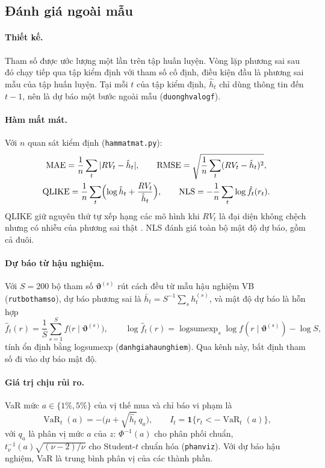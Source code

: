 \documentclass[11pt,a4paper]{article}
\renewcommand{\_}{\gachduoi\allowbreak}
\newcommand{\tep}[1]{\texttt{#1}}
\newcommand{\ham}[1]{\texttt{#1}}
\DeclareMathOperator{\VaR}{VaR}
\newcommand{\btheta}{\boldsymbol\vartheta}
\begin{document}
\subsection{Đánh giá ngoài mẫu}\label{sec:ngoai-mau}
\paragraph{Thiết kế.} Tham số được ước lượng một lần trên tập huấn luyện. Vòng lặp phương sai sau đó chạy tiếp qua tập kiểm định với tham số cố định, điều kiện đầu là phương sai mẫu của tập huấn luyện. Tại mỗi $t$ của tập kiểm định, $\hat h_t$ chỉ dùng thông tin đến $t-1$, nên là dự báo một bước ngoài mẫu (\ham{duong\_h\_va\_logf}).

\paragraph{Hàm mất mát.} Với $n$ quan sát kiểm định (\tep{ham\_mat\_mat.py}):
\begin{gather}
\mathrm{MAE}=\frac1n\sum_t|RV_t-\hat h_t|,\qquad
\mathrm{RMSE}=\sqrt{\frac1n\sum_t(RV_t-\hat h_t)^2},\\
\mathrm{QLIKE}=\frac1n\sum_t\Bigl(\log\hat h_t+\frac{RV_t}{\hat h_t}\Bigr),\qquad
\mathrm{NLS}=-\frac1n\sum_t\log\hat f_t(r_t).
\end{gather}
QLIKE giữ nguyên thứ tự xếp hạng các mô hình khi $RV_t$ là đại diện không chệch nhưng có nhiễu của phương sai thật \cite{patton2011}. NLS đánh giá toàn bộ mật độ dự báo, gồm cả đuôi.

\paragraph{Dự báo từ hậu nghiệm.} Với $S=200$ bộ tham số $\btheta^{(s)}$ rút cách đều từ mẫu hậu nghiệm VB (\ham{rut\_bo\_tham\_so}), dự báo phương sai là $\bar h_t=S^{-1}\sum_s h_t^{(s)}$, và mật độ dự báo là hỗn hợp
\begin{equation}
\hat f_t(r)=\frac1S\sum_{s=1}^{S}f\bigl(r\mid\btheta^{(s)}\bigr),\qquad
\log\hat f_t(r)=\operatorname{logsumexp}_s\log f(r\mid\btheta^{(s)})-\log S,
\end{equation}
tính ổn định bằng logsumexp (\ham{danh\_gia\_hau\_nghiem}). Qua kênh này, bất định tham số đi vào dự báo mật độ.

\paragraph{Giá trị chịu rủi ro.} VaR mức $a\in\{1\%,5\%\}$ của vị thế mua và chỉ báo vi phạm là
\begin{equation}
\VaR_t(a)=-\bigl(\mu+\sqrt{\hat h_t}\,q_a\bigr),\qquad I_t=\mathbf 1\{r_t<-\VaR_t(a)\},
\end{equation}
với $q_a$ là phân vị mức $a$ của $z$: $\Phi^{-1}(a)$ cho phân phối chuẩn, $t_\nu^{-1}(a)\sqrt{(\nu-2)/\nu}$ cho Student-$t$ chuẩn hóa (\ham{phan\_vi\_z}). Với dự báo hậu nghiệm, VaR là trung bình phân vị của các thành phần.
\end{document}
